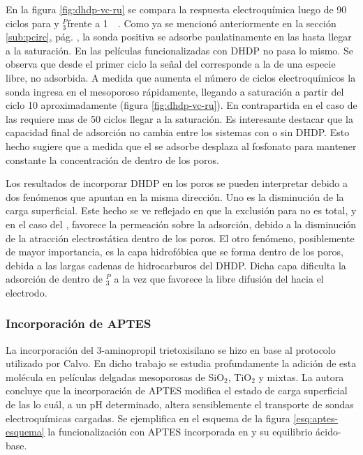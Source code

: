 		    En la figura \ref{fig:dhdp-vc-ru} se compara la respuesta electroquímica luego de 90 ciclos para \pdmZ\space y \pdmZ$^P_3$\space frente a \ru\space \SI{1}{\milli\Molar}. Como ya se mencionó anteriormente en la sección \ref{sub:pcirc}, pág. \pageref{sub:pcirc}, la sonda positiva se adsorbe paulatinamente en las \pdmZ\space hasta llegar a la saturación. En las películas funcionalizadas con DHDP no pasa lo mismo. Se observa que desde el primer ciclo la señal del \ru\space corresponde a la de una especie libre, no adsorbida. A medida que aumenta el número de ciclos electroquímicos la sonda ingresa en el mesoporoso rápidamente, llegando a saturación a partir del ciclo 10 aproximadamente (figura \ref{fig:dhdp-vc-ru}). En contrapartida en el caso de las \pdmZ\space requiere mas de 50 ciclos llegar a la saturación. Es interesante destacar que la capacidad final de adsorción no cambia entre los sistemas con o sin DHDP. Esto hecho sugiere que a medida que el \ru\space se adsorbe desplaza al fosfonato para mantener constante la concentración de \ru\space dentro de los poros.

		    	

			Los resultados de incorporar DHDP en los poros se pueden interpretar debido a dos fenómenos que apuntan en la misma dirección. Uno es la disminución de la carga superficial. Este hecho se ve reflejado en que la exclusión para \fe\space no es total, y en el caso del \ru, favorece la permeación sobre la adsorción, debido a la disminución de la atracción electrostática dentro de los poros. El otro fenómeno, posiblemente de mayor importancia, es la capa hidrofóbica que se forma dentro de los poros, debida a las largas cadenas de hidrocarburos del DHDP. Dicha capa dificulta la adsorción de \ru\space dentro de \pdmZ$^P_3$ a la vez que favorece la libre difusión del \ru\space hacia el electrodo. 

		\subsubsection{Incorporación de APTES}
			
			La incorporación del 3-aminopropil trietoxisilano se hizo en base al protocolo utilizado por Calvo\cite{Calvo20210}. En dicho trabajo se estudia profundamente la adición de esta molécula en películas delgadas mesoporosas de SiO$_2$, TiO$_2$ y mixtas. La autora concluye que la incorporación de APTES modifica el estado de carga superficial de las \pdm\space lo cuál, a un pH determinado, altera sensiblemente el transporte de sondas electroquímicas cargadas. Se ejemplifica en el esquema de la figura \ref{esq:aptes-esquema} la funcionalización con APTES incorporada en \pdmZ\space y su equilibrio ácido-base.

